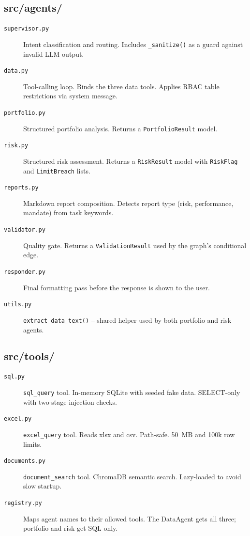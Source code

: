 \documentclass[12pt,a4paper]{article}
\begin{document}
\subsection{src/agents/}

\begin{description}
  \item[\texttt{supervisor.py}] Intent classification and routing. Includes \texttt{\_sanitize()} as a guard against invalid LLM output.
  \item[\texttt{data.py}] Tool-calling loop. Binds the three data tools. Applies RBAC table restrictions via system message.
  \item[\texttt{portfolio.py}] Structured portfolio analysis. Returns a \texttt{PortfolioResult} model.
  \item[\texttt{risk.py}] Structured risk assessment. Returns a \texttt{RiskResult} model with \texttt{RiskFlag} and \texttt{LimitBreach} lists.
  \item[\texttt{reports.py}] Markdown report composition. Detects report type (risk, performance, mandate) from task keywords.
  \item[\texttt{validator.py}] Quality gate. Returns a \texttt{ValidationResult} used by the graph's conditional edge.
  \item[\texttt{responder.py}] Final formatting pass before the response is shown to the user.
  \item[\texttt{utils.py}] \texttt{extract\_data\_text()} -- shared helper used by both portfolio and risk agents.
\end{description}

\subsection{src/tools/}

\begin{description}
  \item[\texttt{sql.py}] \texttt{sql\_query} tool. In-memory SQLite with seeded fake data. SELECT-only with two-stage injection checks.
  \item[\texttt{excel.py}] \texttt{excel\_query} tool. Reads xlsx and csv. Path-safe. 50~MB and 100k row limits.
  \item[\texttt{documents.py}] \texttt{document\_search} tool. ChromaDB semantic search. Lazy-loaded to avoid slow startup.
  \item[\texttt{registry.py}] Maps agent names to their allowed tools. The DataAgent gets all three; portfolio and risk get SQL only.
\end{description}
\end{document}
